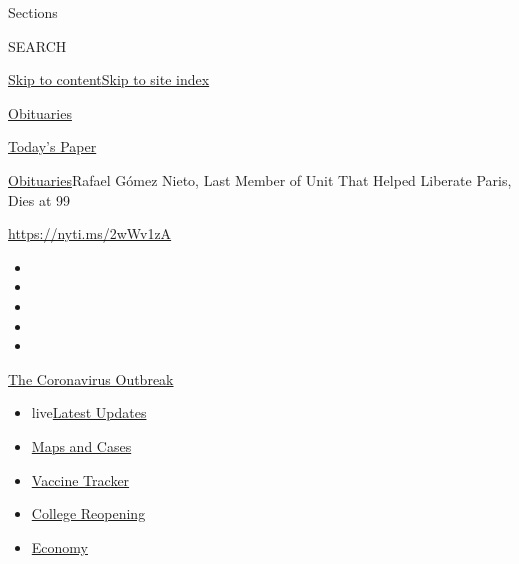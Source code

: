 Sections

SEARCH

\protect\hyperlink{site-content}{Skip to
content}\protect\hyperlink{site-index}{Skip to site index}

\href{https://www.nytimes3xbfgragh.onion/section/obituaries}{Obituaries}

\href{https://myaccount.nytimes3xbfgragh.onion/auth/login?response_type=cookie\&client_id=vi}{}

\href{https://www.nytimes3xbfgragh.onion/section/todayspaper}{Today's
Paper}

\href{/section/obituaries}{Obituaries}\textbar{}Rafael Gómez Nieto, Last
Member of Unit That Helped Liberate Paris, Dies at 99

\url{https://nyti.ms/2wWv1zA}

\begin{itemize}
\item
\item
\item
\item
\item
\end{itemize}

\href{https://www.nytimes3xbfgragh.onion/news-event/coronavirus?action=click\&pgtype=Article\&state=default\&region=TOP_BANNER\&context=storylines_menu}{The
Coronavirus Outbreak}

\begin{itemize}
\tightlist
\item
  live\href{https://www.nytimes3xbfgragh.onion/2020/08/04/world/coronavirus-covid-19.html?action=click\&pgtype=Article\&state=default\&region=TOP_BANNER\&context=storylines_menu}{Latest
  Updates}
\item
  \href{https://www.nytimes3xbfgragh.onion/interactive/2020/us/coronavirus-us-cases.html?action=click\&pgtype=Article\&state=default\&region=TOP_BANNER\&context=storylines_menu}{Maps
  and Cases}
\item
  \href{https://www.nytimes3xbfgragh.onion/interactive/2020/science/coronavirus-vaccine-tracker.html?action=click\&pgtype=Article\&state=default\&region=TOP_BANNER\&context=storylines_menu}{Vaccine
  Tracker}
\item
  \href{https://www.nytimes3xbfgragh.onion/2020/08/02/us/covid-college-reopening.html?action=click\&pgtype=Article\&state=default\&region=TOP_BANNER\&context=storylines_menu}{College
  Reopening}
\item
  \href{https://www.nytimes3xbfgragh.onion/live/2020/08/03/business/stock-market-today-coronavirus?action=click\&pgtype=Article\&state=default\&region=TOP_BANNER\&context=storylines_menu}{Economy}
\end{itemize}

